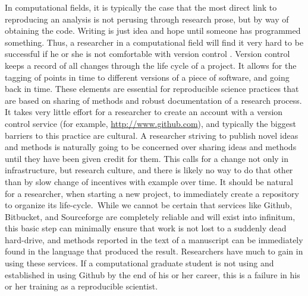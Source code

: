 \documentclass{report}
\begin{document}
In computational fields, it is typically the case that the most direct
link to reproducing an analysis is not perusing through research prose,
but by way of obtaining the code. Writing is just idea and hope until
someone has programmed something. Thus, a researcher in a computational
field will find it very hard to be successful if he or she is not
comfortable with version control \cite{Zandstra2013-st}.
Version control keeps a record of all changes through the life cycle of
a project. It allows for the tagging of points in time to different
versions of a piece of software, and going back in time. These elements
are essential for reproducible science practices that are based on
sharing of methods and robust documentation of a research process. It
takes very little effort for a researcher to create an account with a
version control service (for example,
\href{http://www.github.com}{http://www.github.com}),
and typically the biggest barriers to this practice are cultural. A
researcher striving to publish novel ideas and methods is naturally
going to be concerned over sharing ideas and methods until they have
been given credit for them. This calls for a change not only in
infrastructure, but research culture, and there is likely no way to do
that other than by slow change of incentives with example over time. It
should be natural for a researcher, when starting a new project, to
immediately create a repository to organize its life-cycle.~While we
cannot be certain that services like Github, Bitbucket, and Sourceforge
are completely reliable and will exist into infinitum, this basic step
can minimally ensure that work is not lost to a suddenly dead
hard-drive, and methods reported in the text of a manuscript can be
immediately found in the language that produced the result. Researchers
have much to gain in using these services. If a computational graduate
student is not using and established in using Github by the end of his
or her career, this is a failure in his or her training as a
reproducible scientist.
\end{document}
